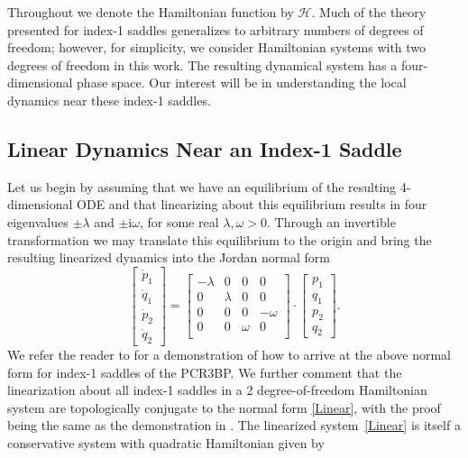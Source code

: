 \documentclass[11pt]{article}
\numberwithin{equation}{section}
\theoremstyle{plain}
\begin{document}
Throughout we denote the Hamiltonian function by $\mathcal{H}$. 
Much of the theory presented for index-1 saddles generalizes to arbitrary numbers of degrees of freedom; however, for simplicity, we consider Hamiltonian systems with two degrees of freedom in this work. 
The resulting dynamical system has a four-dimensional phase space. Our interest will be in understanding the local dynamics near these index-1 saddles. 



\subsection{Linear Dynamics Near an Index-1 Saddle}

Let us begin by assuming that we have an equilibrium of the resulting 4-dimensional ODE and that linearizing about this equilibrium results in four eigenvalues $\pm \lambda$ and $\pm \mathrm{i}\omega$, for some real $\lambda,\omega > 0$. Through an invertible transformation we may translate this equilibrium to the origin and bring the resulting linearized dynamics into the Jordan normal form
\begin{equation}\label{Linear}
	\begin{bmatrix}
		\dot p_1 \\ \dot q_1 \\ \dot p_2 \\ \dot q_2
	\end{bmatrix} = \begin{bmatrix}
		-\lambda & 0 & 0 & 0 \\
		0 & \lambda & 0 & 0 \\
		0 & 0 & 0 & -\omega \\
		0 & 0 & \omega & 0 \\
	\end{bmatrix}\cdot\begin{bmatrix}
		p_1 \\ q_1 \\ p_2 \\ q_2
	\end{bmatrix}. 
\end{equation} 
We refer the reader to \cite[Section~2.6]{RossBook} for a demonstration of how to arrive at the above normal form for index-1 saddles of the PCR3BP. We further comment that the linearization about all index-1 saddles in a 2 degree-of-freedom Hamiltonian system are topologically conjugate to the normal form \eqref{Linear}, with the proof being the same as the demonstration in \cite{RossBook}. The linearized system~\eqref{Linear} is itself a conservative system with quadratic Hamiltonian given by
\end{document}
